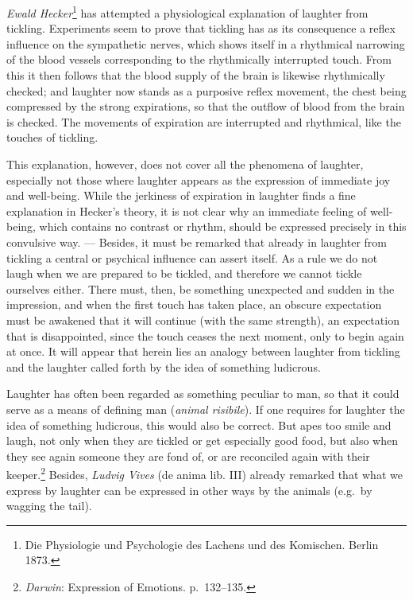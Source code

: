 \documentclass[12pt,a4paper]{book}
\newcommand{\opage}[1]{\marginnote{\footnotesize\textit{[#1]}}}
\begin{document}
\emph{Ewald Hecker}\footnote{Die Physiologie und Psychologie des
Lachens und des Komischen. Berlin 1873.} has attempted a physiological
explanation of laughter from tickling. Experiments seem to prove that
tickling has as its consequence a reflex influence on the sympathetic
nerves, which shows itself in a rhythmical narrowing of the blood
vessels
\opage{345}corresponding to the rhythmically interrupted touch. From
this it then follows that the blood supply of the brain is likewise
rhythmically checked; and laughter now stands as a purposive reflex
movement, the chest being compressed by the strong expirations, so that
the outflow of blood from the brain is checked. The movements of
expiration are interrupted and rhythmical, like the touches of
tickling.


This explanation, however, does not cover all the phenomena of
laughter, especially not those where laughter appears as the expression
of immediate joy and well-being. While the jerkiness of expiration in
laughter finds a fine explanation in Hecker's theory, it is not clear
why an immediate feeling of well-being, which contains no contrast or
rhythm, should be expressed precisely in this convulsive way. ---
Besides, it must be remarked that already in laughter from tickling a
central or psychical influence can assert itself. As a rule we do not
laugh when we are prepared to be tickled, and therefore we cannot tickle
ourselves either. There must, then, be something unexpected and sudden
in the impression, and when the first touch has taken place, an obscure
expectation must be awakened that it will continue (with the same
strength), an expectation that is disappointed, since the touch ceases
the next moment, only to begin again at once. It will appear that
herein lies an analogy between laughter from tickling and the laughter
called forth by the idea of something ludicrous.

Laughter has often been regarded as something peculiar to man, so that
it could serve as a means of defining man (\textit{animal risibile}).
If one requires for laughter the idea of something ludicrous, this
would also be correct. But apes too smile and laugh, not only when they
are tickled or get especially good food, but also when they see again
someone they are fond of, or are reconciled again with their
keeper.\footnote{\emph{Darwin}: Expression of Emotions. p.~132--135.}
Besides, \emph{Ludvig Vives} (de anima lib. III) already remarked that
what we express by laughter can be expressed in other ways by the
animals (e.g.\ by wagging the tail).
\end{document}
